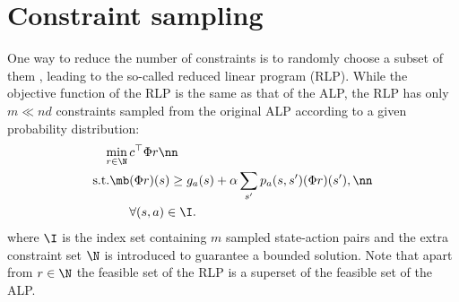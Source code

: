 \section{Constraint sampling}
One way to reduce the number of constraints is to randomly choose a subset of them \cite{CS},
leading to the so-called reduced linear program (RLP). 
While the objective function of the RLP is the same as that of the ALP, 
the RLP has only $m \ll nd$ constraints sampled from the original ALP according to a given probability distribution:
\begin{align}\label{rlp}
\min_{r\in \N}\, &c^\top \Phi r\nn\\
\text{s.t.}\mb &(\Phi r)(s)\geq g_a(s)+\alpha\sum_{s'}p_a(s,s')(\Phi r)(s'), \nn\\
&\forall (s,a) \in \I.
\end{align}
where $\I$ is the index set containing $m$ sampled state-action pairs and the extra constraint set $\N$ is introduced to guarantee a bounded solution. Note that apart from $r\in \N$ the feasible set of the RLP is a superset of the feasible set of the ALP. 
\begin{comment}
The index set $\I$ in \eqref{rlp} naturally gives rise to the definition of an $nd\times m$ constraint sampling matrix $\M$:
\begin{definition}\label{csampmat}
Let $\I=\{(s_1,a_1),\ldots,(s_m,a_m)\}$ be the sampled state-action pairs and let $q_i \eqdef s_i+(a_i-1)\times n$, $i=1,\ldots,m$. Define the constraint sampling matrix $\M \in \R^{nd\times m}$ associated with the index set $\I$ by
\begin{align}
\M(i,j)
=
\begin{cases}
1, & \text{ if } q_i = j\,;\\
0, & \text{ otherwise}.
\end{cases}
\end{align}
\end{definition}
The RLP can then be represented in short as
\begin{align}\label{rlpshort}
\begin{split}
\min_{r\in \N}\, &c^\top \Phi r\\
\text{s.t.}\mb & \M^\top E \Phi r \geq \M^\top H \Phi r\,.
\end{split}
\end{align}
The error bounds for the RLP can be found in \cite{CS} and the RLP has been shown to perform well in experiments \cite{ALP,CS,CST} in various domains such as Tetris and in network of queues. An alternative to constraint sampling is to introduce function approximation in the dual variables of the ALP \cite{ALP-Bor,dolgov}. While such an approach has been applied in practice, there are no known theoretical guarantess for function approximation of the dual variables.\par
In the next section, we present the generalized reduced linear program (GRLP) which is the main object of study in this paper.
\end{comment}


